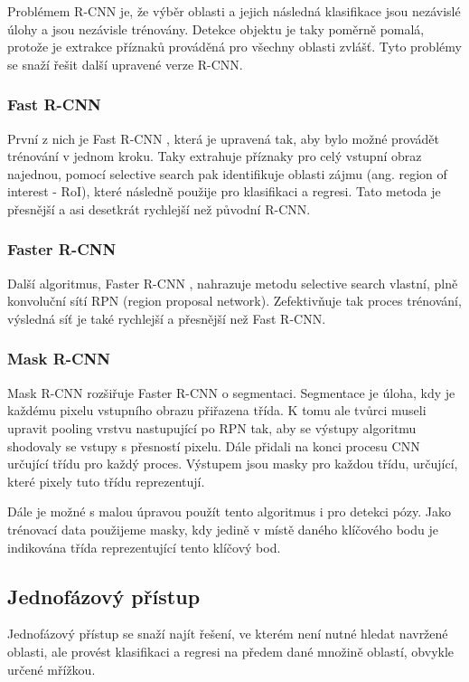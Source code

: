 Problémem R-CNN je, že výběr oblasti a jejich následná klasifikace jsou
nezávislé úlohy a jsou nezávisle trénovány. Detekce objektu je taky poměrně
pomalá, protože je extrakce příznaků prováděná pro všechny oblasti zvlášť. Tyto
problémy se snaží řešit další upravené verze R-CNN.

\subsubsection{Fast R-CNN}
První z nich je Fast R-CNN \cite{fast-r-cnn}, která je upravená tak, aby bylo
možné provádět trénování v jednom kroku. Taky extrahuje příznaky pro celý
vstupní obraz najednou, pomocí selective search pak identifikuje oblasti zájmu
(ang. region of interest - RoI), které následně použije pro klasifikaci a
regresi. Tato metoda je přesnější a asi desetkrát rychlejší než původní R-CNN.

\subsubsection{Faster R-CNN}
Další algoritmus, Faster R-CNN \cite{faster-r-cnn}, nahrazuje metodu selective
search vlastní, plně konvoluční sítí RPN (region proposal network).
Zefektivňuje tak proces trénování, výsledná síť je také rychlejší a přesnější
než Fast R-CNN.

\subsubsection{Mask R-CNN}
Mask R-CNN \cite{mask-r-cnn} rozšiřuje Faster R-CNN o segmentaci. Segmentace je
úloha, kdy je každému pixelu vstupního obrazu přiřazena třída. K tomu ale
tvůrci museli upravit pooling vrstvu nastupující po RPN tak, aby se výstupy
algoritmu shodovaly se vstupy s přesností pixelu. Dále přidali na konci procesu
CNN určující třídu pro každý proces. Výstupem jsou masky pro každou třídu,
určující, které pixely tuto třídu reprezentují.

Dále je možné s malou úpravou použít tento algoritmus i pro detekci pózy. Jako
trénovací data použijeme masky, kdy jedině v místě daného klíčového bodu je
indikována třída reprezentující tento klíčový bod.

\subsection{Jednofázový přístup}

Jednofázový přístup se snaží najít řešení, ve kterém není nutné hledat navržené
oblasti, ale provést klasifikaci a regresi na předem dané množině oblastí,
obvykle určené mřížkou.

